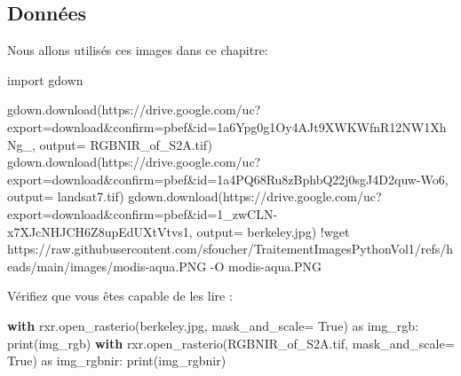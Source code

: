 \documentclass[
  11pt,
  letterpaper,
  open=any,
  twoside=false,
  french]{scrbook}
\newenvironment{Shaded}{\begin{snugshade}}{\end{snugshade}}
\newcommand{\BuiltInTok}[1]{\textcolor[rgb]{0.00,0.23,0.31}{#1}}
\newcommand{\ControlFlowTok}[1]{\textcolor[rgb]{0.00,0.23,0.31}{\textbf{#1}}}
\newcommand{\ImportTok}[1]{\textcolor[rgb]{0.00,0.46,0.62}{#1}}
\newcommand{\NormalTok}[1]{\textcolor[rgb]{0.00,0.23,0.31}{#1}}
\newcommand{\OperatorTok}[1]{\textcolor[rgb]{0.37,0.37,0.37}{#1}}
\newcommand{\StringTok}[1]{\textcolor[rgb]{0.13,0.47,0.30}{#1}}
\newcommand{\VariableTok}[1]{\textcolor[rgb]{0.07,0.07,0.07}{#1}}
\begin{document}
\subsection{Données}\label{donnuxe9es}

Nous allons utilisés ces images dans ce chapitre:

\begin{Shaded}
\begin{Highlighting}[]
\ImportTok{import}\NormalTok{ gdown}

\NormalTok{gdown.download(}\StringTok{\textquotesingle{}https://drive.google.com/uc?export=download\&confirm=pbef\&id=1a6Ypg0g1Oy4AJt9XWKWfnR12NW1XhNg\_\textquotesingle{}}\NormalTok{, output}\OperatorTok{=} \StringTok{\textquotesingle{}RGBNIR\_of\_S2A.tif\textquotesingle{}}\NormalTok{)}
\NormalTok{gdown.download(}\StringTok{\textquotesingle{}https://drive.google.com/uc?export=download\&confirm=pbef\&id=1a4PQ68Ru8zBphbQ22j0sgJ4D2quw{-}Wo6\textquotesingle{}}\NormalTok{, output}\OperatorTok{=} \StringTok{\textquotesingle{}landsat7.tif\textquotesingle{}}\NormalTok{)}
\NormalTok{gdown.download(}\StringTok{\textquotesingle{}https://drive.google.com/uc?export=download\&confirm=pbef\&id=1\_zwCLN{-}x7XJcNHJCH6Z8upEdUXtVtvs1\textquotesingle{}}\NormalTok{, output}\OperatorTok{=} \StringTok{\textquotesingle{}berkeley.jpg\textquotesingle{}}\NormalTok{)}
\OperatorTok{!}\NormalTok{wget https:}\OperatorTok{//}\NormalTok{raw.githubusercontent.com}\OperatorTok{/}\NormalTok{sfoucher}\OperatorTok{/}\NormalTok{TraitementImagesPythonVol1}\OperatorTok{/}\NormalTok{refs}\OperatorTok{/}\NormalTok{heads}\OperatorTok{/}\NormalTok{main}\OperatorTok{/}\NormalTok{images}\OperatorTok{/}\NormalTok{modis}\OperatorTok{{-}}\NormalTok{aqua.PNG }\OperatorTok{{-}}\NormalTok{O modis}\OperatorTok{{-}}\NormalTok{aqua.PNG}
\end{Highlighting}
\end{Shaded}

Vérifiez que vous êtes capable de les lire :

\begin{Shaded}
\begin{Highlighting}[]
\ControlFlowTok{with}\NormalTok{ rxr.open\_rasterio(}\StringTok{\textquotesingle{}berkeley.jpg\textquotesingle{}}\NormalTok{, mask\_and\_scale}\OperatorTok{=} \VariableTok{True}\NormalTok{) }\ImportTok{as}\NormalTok{ img\_rgb:}
    \BuiltInTok{print}\NormalTok{(img\_rgb)}
\ControlFlowTok{with}\NormalTok{ rxr.open\_rasterio(}\StringTok{\textquotesingle{}RGBNIR\_of\_S2A.tif\textquotesingle{}}\NormalTok{, mask\_and\_scale}\OperatorTok{=} \VariableTok{True}\NormalTok{) }\ImportTok{as}\NormalTok{ img\_rgbnir:}
    \BuiltInTok{print}\NormalTok{(img\_rgbnir)}
\end{Highlighting}
\end{Shaded}
\end{document}
